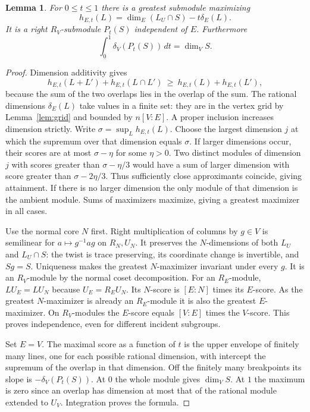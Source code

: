 \documentclass[11pt,a4paper,reqno]{amsart}
\numberwithin{equation}{section}
\newtheorem{lemma}[theorem]{Lemma}
\theoremstyle{remark}
\begin{document}
\begin{lemma}\label{lem:max}
For \(0\le t\le1\) there is a greatest submodule maximizing
\[
      h_{E,t}(L)=\dim_E(L_U\cap S)-t\delta_E(L).
\]
It is a right \(R_V\)-submodule \(P_t(S)\) independent of \(E\). Furthermore
\[
                 \int_0^1\delta_V(P_t(S))\,dt=\dim_V S .
\]
\end{lemma}
\begin{proof}
Dimension additivity gives
\[
 h_{E,t}(L+L')+h_{E,t}(L\cap L')\ \ge\ h_{E,t}(L)+h_{E,t}(L'),
\]
because the sum of the two overlaps lies in the overlap of the sum. The rational dimensions \(\delta_E(L)\) take values in a finite set: they are in the vertex grid by Lemma~\ref{lem:grid} and bounded by \(n[V:E]\). A proper inclusion increases dimension strictly. Write \(\sigma=\sup_L h_{E,t}(L)\). Choose the largest dimension \(j\) at which the supremum over that dimension equals \(\sigma\). If larger dimensions occur, their scores are at most \(\sigma-\eta\) for some \(\eta>0\). Two distinct modules of dimension \(j\) with scores greater than \(\sigma-\eta/3\) would have a sum of larger dimension with score greater than \(\sigma-2\eta/3\). Thus sufficiently close approximants coincide, giving attainment. If there is no larger dimension the only module of that dimension is the ambient module. Sums of maximizers maximize, giving a greatest maximizer in all cases.

Use the normal core \(N\) first. Right multiplication of columns by \(g\in V\) is semilinear for \(a\mapsto g^{-1}ag\) on \(R_N,U_N\). It preserves the \(N\)-dimensions of both \(L_U\) and \(L_U\cap S\): the twist is trace preserving, its coordinate change is invertible, and \(Sg=S\). Uniqueness makes the greatest \(N\)-maximizer invariant under every \(g\). It is an \(R_V\)-module by the normal coset decomposition. For an \(R_E\)-module, \(LU_E=LU_N\) because \(U_E=R_EU_N\). Its \(N\)-score is \([E:N]\) times its \(E\)-score. As the greatest \(N\)-maximizer is already an \(R_E\)-module it is also the greatest \(E\)-maximizer. On \(R_V\)-modules the \(E\)-score equals \([V:E]\) times the \(V\)-score. This proves independence, even for different incident subgroups.

Set \(E=V\). The maximal score as a function of \(t\) is the upper envelope of finitely many lines, one for each possible rational dimension, with intercept the supremum of the overlap in that dimension. Off the finitely many breakpoints its slope is \(-\delta_V(P_t(S))\). At \(0\) the whole module gives \(\dim_V S\). At \(1\) the maximum is zero since an overlap has dimension at most that of the rational module extended to \(U_V\). Integration proves the formula.
\end{proof}
\end{document}
